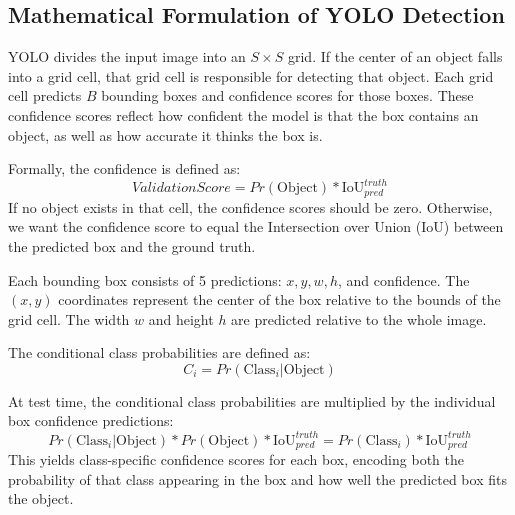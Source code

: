 \subsection{Mathematical Formulation of YOLO Detection}
YOLO divides the input image into an $S \times S$ grid. If the center of an object falls into a grid cell, that grid cell is responsible for detecting that object. Each grid cell predicts $B$ bounding boxes and confidence scores for those boxes. These confidence scores reflect how confident the model is that the box contains an object, as well as how accurate it thinks the box is. 

Formally, the confidence is defined as:
\begin{equation}
    Validation Score = Pr(\text{Object}) * \text{IoU}_{pred}^{truth}
\end{equation}
If no object exists in that cell, the confidence scores should be zero. Otherwise, we want the confidence score to equal the Intersection over Union (IoU) between the predicted box and the ground truth.

Each bounding box consists of 5 predictions: $x, y, w, h$, and confidence. The $(x, y)$ coordinates represent the center of the box relative to the bounds of the grid cell. The width $w$ and height $h$ are predicted relative to the whole image. 

The conditional class probabilities are defined as:
\begin{equation}
    C_i = Pr(\text{Class}_i | \text{Object})
\end{equation}

At test time, the conditional class probabilities are multiplied by the individual box confidence predictions:
\begin{equation}
    Pr(\text{Class}_i | \text{Object}) * Pr(\text{Object}) * \text{IoU}_{pred}^{truth} = Pr(\text{Class}_i) * \text{IoU}_{pred}^{truth}
\end{equation}
This yields class-specific confidence scores for each box, encoding both the probability of that class appearing in the box and how well the predicted box fits the object.

